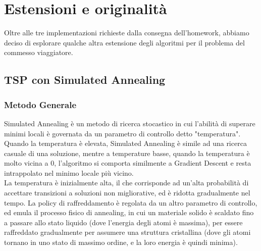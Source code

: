 \section{Estensioni e originalità}
\label{cap:extensions-and-originalities}

Oltre alle tre implementazioni richieste dalla consegna dell'homework,
abbiamo deciso di esplorare qualche altra estensione degli algoritmi
per il problema del commesso viaggiatore.

\subsection{TSP con Simulated Annealing}

\subsubsection{Metodo Generale}


\noindent Simulated Annealing è un metodo di ricerca stocastico in cui l'abilità di superare minimi locali è governata da un parametro di controllo detto "temperatura". Quando la temperatura è elevata, Simulated Annealing è simile ad una ricerca casuale di una soluzione, mentre a temperature basse, quando la temperatura è molto vicina a 0, l'algoritmo si comporta similmente a Gradient Descent e resta intrappolato nel minimo locale più vicino. \\

\noindent La temperatura è inizialmente alta, il che corrisponde ad un'alta probabilità di accettare transizioni a soluzioni non migliorative, ed è ridotta gradualmente nel tempo. La policy di raffreddamento è regolata da un altro parametro di controllo, ed emula il processo fisico di annealing, in cui un materiale solido è scaldato fino a passare allo stato liquido (dove l'energia degli atomi è massima), per essere raffreddato gradualmente per assumere una struttura cristallina (dove gli atomi tornano in uno stato di massimo ordine, e la loro energia è quindi minima). \\


